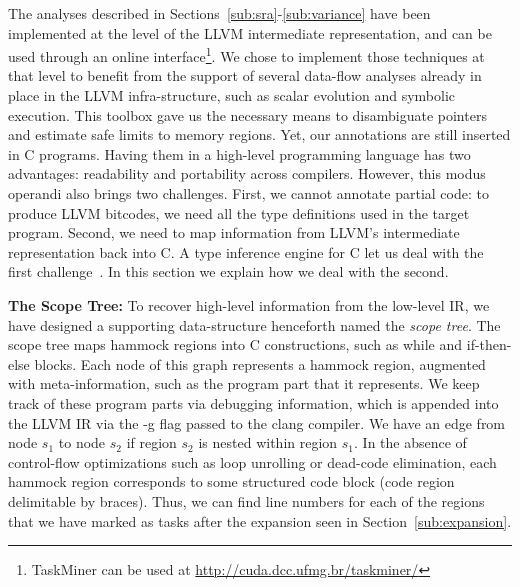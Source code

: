 \documentclass[sigplan,10pt,screen]{acmart}
\newcommand\Taskminer{\mbox{\textsf{TaskMiner}}}
\begin{document}
The analyses described in Sections~\ref{sub:sra}-\ref{sub:variance} have
been implemented at the level of the LLVM intermediate representation, and can be used
through an online interface\footnote{\Taskminer{} can be
used at \url{http://cuda.dcc.ufmg.br/taskminer/}}.
We chose to implement those techniques at that level to benefit from the support
of several data-flow analyses already in place in the LLVM infra-structure, such as
scalar evolution and symbolic execution.
This toolbox gave us the necessary means to disambiguate pointers
and estimate safe limits to memory regions.
Yet, our annotations are still inserted in C programs.
Having them in a high-level programming language has two advantages:
readability and portability across compilers.
However, this modus operandi also brings two challenges.
First, we cannot annotate partial code: to produce LLVM bitcodes, we need all the type
definitions used in the target program.
Second, we need to map information from LLVM's intermediate representation back into C.
A type inference engine for C let us deal with the first
challenge~\cite{Melo18}.
In this section we explain how we deal with the second.

\noindent
\textbf{The Scope Tree:}
To recover high-level information from the low-level IR, we have designed a
supporting data-structure henceforth named the {\em scope tree}.
The scope tree maps hammock regions into C constructions, such as
\textsf{while} and \textsf{if-then-else} blocks.
Each node of this graph represents a hammock region, augmented with
meta-information, such as the program part that it represents.
We keep track of these program parts via debugging information, which is
appended into the LLVM IR via the \textsf{-g} flag passed to the \textsf{clang}
compiler.
We have an edge from node $s_1$ to node $s_2$ if region $s_2$ is nested
within region $s_1$.
In the absence of control-flow optimizations such as loop unrolling or
dead-code elimination, each hammock region corresponds to some structured
code block (code region delimitable by braces).
Thus, we can find line numbers for each of the regions that we have marked
as tasks after the expansion seen in Section~\ref{sub:expansion}.
\end{document}
